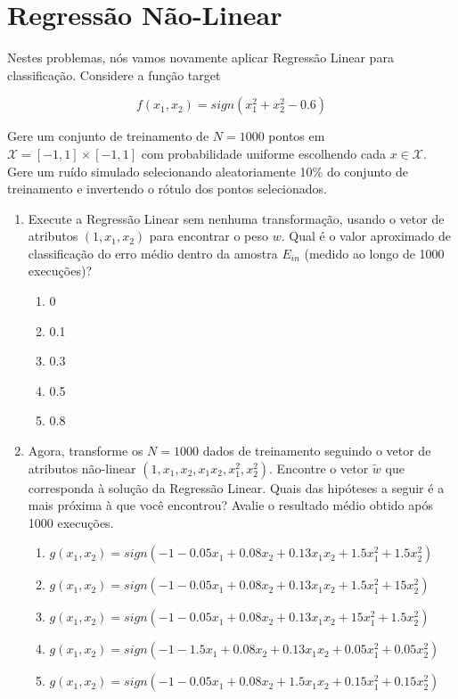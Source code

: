 \section{Regressão Não-Linear}

Nestes problemas, nós vamos novamente aplicar Regressão Linear para classificação. Considere a função target

$$f(x_1,x_2) = sign(x_1^2 + x_2^2 - 0.6) $$

Gere um conjunto de treinamento de $N = 1000$ pontos em $\mathcal{X} = [-1, 1] \times [-1, 1]$ com probabilidade uniforme escolhendo cada $x \in \mathcal{X}$. Gere um ruído simulado selecionando aleatoriamente 10\% do conjunto de treinamento e invertendo o rótulo dos pontos selecionados.

\begin{enumerate}
    \item Execute a Regressão Linear sem nenhuma transformação, usando o vetor de atributos $(1, x_1, x_2)$ para encontrar o peso $w$. Qual é o valor aproximado de classificação do erro médio dentro da amostra $E_{in}$ (medido ao longo de 1000 execuções)?
    
    \begin{enumerate}
        \item 0
        \item 0.1
        \item 0.3
        \item 0.5
        \item 0.8
    \end{enumerate}
    
    \item Agora, transforme os $N = 1000$ dados de treinamento seguindo o vetor de atributos não-linear $(1, x_1, x_2, x_1x_2, x_1^2, x_2^2)$. Encontre o vetor $\tilde{w}$ que corresponda à solução da Regressão Linear. Quais das hipóteses a seguir é a mais próxima à que você encontrou? Avalie o resultado médio obtido após 1000 execuções.
    
    \begin{enumerate}
        \item $g(x_1,x_2) = sign(-1-0.05x_1+0.08x_2+0.13x_1x_2+1.5x_1^2+1.5x_2^2)$
        \item $g(x_1,x_2) = sign(-1-0.05x_1+0.08x_2+0.13x_1x_2+1.5x_1^2+15x_2^2)$
        \item $g(x_1,x_2) = sign(-1-0.05x_1+0.08x_2+0.13x_1x_2+15x_1^2+1.5x_2^2)$
        \item $g(x_1,x_2) = sign(-1-1.5x_1+0.08x_2+0.13x_1x_2+0.05x_1^2+0.05x_2^2)$
        \item $g(x_1,x_2) = sign(-1-0.05x_1+0.08x_2+1.5x_1x_2+0.15x_1^2+0.15x_2^2)$
    \end{enumerate}
    

\end{enumerate}
